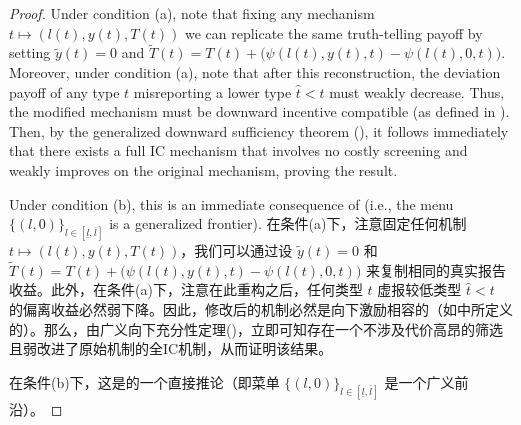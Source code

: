 \documentclass[12pt,letterpaper]{article}
\newenvironment{original}{\color{black}\noindent}{}
\newenvironment{translation}{\color{blue}\noindent}{}
\theoremstyle{plain}
\theoremstyle{definition}
\theoremstyle{remark}
\renewcommand{\1}{\mathds{1}}
\theoremstyle{definition}
\begin{document}
\begin{proof}
\begin{original}
Under condition (a), note that fixing any mechanism $t \mapsto (l(t), y(t), T(t))$ we can replicate the same truth-telling payoff by setting $\tilde{y}(t) = 0$ and $\widetilde{T}(t) = T(t) + \big(\psi(l(t), y(t), t) - \psi(l(t), 0, t)\big)$. Moreover, under condition (a), note that after this reconstruction, the deviation payoff of any type $t$ misreporting a lower type  $\hat{t} < t$ must weakly decrease. Thus, the modified mechanism must be downward incentive compatible (as defined in ). Then, by the generalized downward sufficiency theorem (), it follows immediately that there exists a full IC mechanism that involves no costly screening and weakly improves on the original mechanism, proving the result.

Under condition (b), this is an immediate consequence of  (i.e., the menu $\{(l, 0)\}_{l\in [\underline{l}, \overline{l}]}$ is a generalized frontier).
\end{original}
\begin{translation}
在条件(a)下，注意固定任何机制 $t \mapsto (l(t), y(t), T(t))$，我们可以通过设 $\tilde{y}(t) = 0$ 和 $\widetilde{T}(t) = T(t) + \big(\psi(l(t), y(t), t) - \psi(l(t), 0, t)\big)$ 来复制相同的真实报告收益。此外，在条件(a)下，注意在此重构之后，任何类型 $t$ 虚报较低类型 $\hat{t} < t$ 的偏离收益必然弱下降。因此，修改后的机制必然是向下激励相容的（如中所定义的）。那么，由广义向下充分性定理()，立即可知存在一个不涉及代价高昂的筛选且弱改进了原始机制的全IC机制，从而证明该结果。

在条件(b)下，这是的一个直接推论（即菜单 $\{(l, 0)\}_{l\in [\underline{l}, \overline{l}]}$ 是一个广义前沿）。
\end{translation}
\end{proof}
\end{document}
